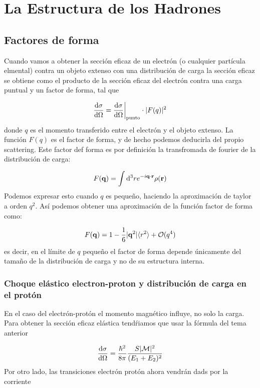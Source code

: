 \chapter{La Estructura de los Hadrones}


\section{Factores de forma}

Cuando vamos a obtener la sección eficaz de un electrón (o cualquier partícula elmental) contra un objeto extenso con una distribución de carga la sección eficaz se obtiene como el producto de la sección eficaz del electrón contra una carga puntual y un factor de forma, tal que

\begin{equation}
	\dv{\sigma}{\Omega} = \dv{\sigma}{\Omega}\bigg|_{\text{punto}} \cdot |F(q)|^2
\end{equation}
donde $q$ es el momento transferido entre el electrón y el objeto extenso. La función $F(q)$ es el factor de forma, y de hecho podemos deducirla del propio scattering. Este factor def forma es por definición la transfromada de fourier de la distribución de carga:

\begin{equation}
	F(\mathbf{q}) = \int \mathrm{d}^3r e^{-i \mathbf{q} \cdot \mathbf{r}} \rho(\mathbf{r})
\end{equation}
Podemos expresar esto cuando $q$ es pequeño, haciendo la aproximación de taylor a orden $q^2$. Así podemos obtener una aproximación de la función factor de forma como:

\begin{equation}
	F(\mathbf{q}) = 1 - \frac{1}{6} |\mathbf{q}^2| \langle r^2 \rangle + \mathcal{O}(q^4)
\end{equation}
es decir, en el límite de $q$ pequeño el factor de forma depende únicamente del tamaño de la distribución de carga y no de su estructura interna.


\subsection{Choque elástico electron-proton y distribución de carga en el protón}

En el caso del electrón-protón el momento magnético influye, no solo la carga. Para obtener la sección eficaz elástica tendŕiamos que usar la fórmula del tema anterior

\begin{equation}
	\dv{\sigma}{\Omega} = \frac{\hbar^2}{8 \pi} \frac{S |\mathcal{M}|^2}{(E_1+E_2)^2}
\end{equation}
Por otro lado, las transiciones electrón protón ahora vendrán dads por la corriente

